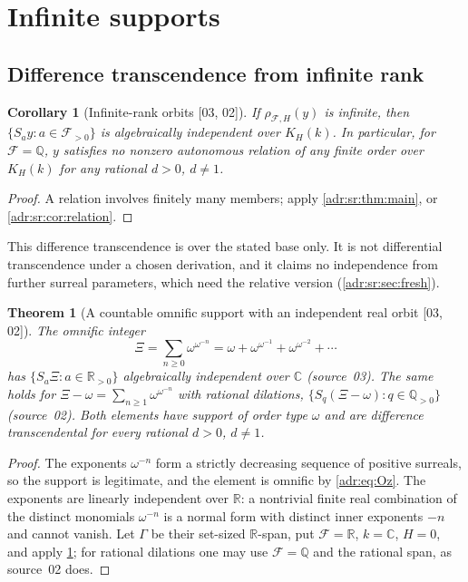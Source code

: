 \documentclass[11pt,letterpaper]{article}
\numberwithin{equation}{section}
\newtheorem{theorem}{Theorem}[section]
\newtheorem{corollary}[corollary]{Corollary}
\theoremstyle{definition}
\theoremstyle{remark}
\newcommand{\C}{\mathbb C}
\newcommand{\R}{\mathbb R}
\newcommand{\Q}{\mathbb Q}
\newcommand{\src}[1]{\textup{[#1]}}%
\begin{document}
\section{Infinite supports}
\label{adr:sr:sec:infinite}

\subsection{Difference transcendence from infinite rank}

\begin{corollary}[Infinite-rank orbits \src{03, 02}]
\label{adr:sr:cor:infinite}
If $\rho_{\mathcal F,H}(y)$ is infinite, then $\{S_ay:a\in\mathcal F_{>0}\}$ is
algebraically independent over $K_H(k)$. In particular, for $\mathcal F=\Q$,
$y$ satisfies no nonzero autonomous relation of any finite order over $K_H(k)$
for any rational $d>0$, $d\ne1$.
\end{corollary}
\begin{proof}
A relation involves finitely many members; apply \cref{adr:sr:thm:main}, or
\cref{adr:sr:cor:relation}.
\end{proof}

This difference transcendence is over the stated base only. It is not
differential transcendence under a chosen derivation, and it claims no
independence from further surreal parameters, which need the relative version
(\cref{adr:sr:sec:fresh}).

\begin{theorem}[A countable omnific support with an independent real orbit \src{03, 02}]
\label{adr:sr:thm:Xi}
The omnific integer
\begin{equation}\label{adr:sr:eq:Xi}
 \Xi=\sum_{n\ge0}\omega^{\omega^{-n}}=\omega+\omega^{\omega^{-1}}+\omega^{\omega^{-2}}+\cdots
\end{equation}
has $\{S_a\Xi:a\in\R_{>0}\}$ algebraically independent over $\C$
(source~03). The same holds for $\Xi-\omega=\sum_{n\ge1}\omega^{\omega^{-n}}$
with rational dilations, $\{S_q(\Xi-\omega):q\in\Q_{>0}\}$ (source~02). Both
elements have support of order type $\omega$ and are difference transcendental
for every rational $d>0$, $d\ne1$.
\end{theorem}
\begin{proof}
The exponents $\omega^{-n}$ form a strictly decreasing sequence of positive
surreals, so the support is legitimate, and the element is omnific by
\eqref{adr:eq:Oz}. The exponents are linearly independent over $\R$: a
nontrivial finite real combination of the distinct monomials $\omega^{-n}$ is a
normal form with distinct inner exponents $-n$ and cannot vanish. Let $\Gamma$
be their set-sized $\R$-span, put $\mathcal F=\R$, $k=\C$, $H=0$, and apply
\cref{adr:sr:cor:infinite}; for rational dilations one may use $\mathcal F=\Q$
and the rational span, as source~02 does.
\end{proof}
\end{document}
